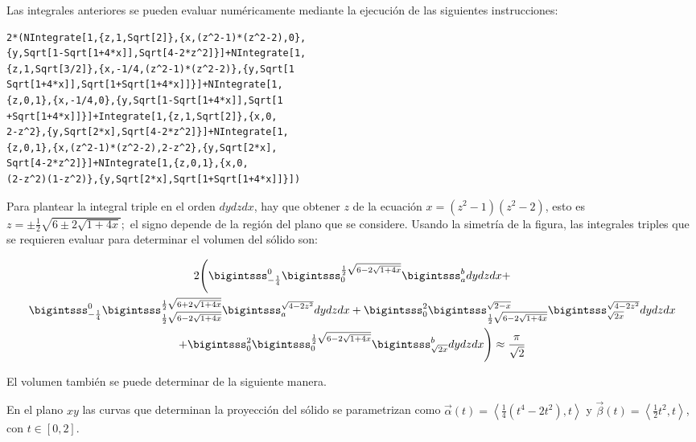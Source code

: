 Las integrales anteriores se pueden evaluar numéricamente mediante la ejecución de las siguientes instrucciones:

\begin{tcolorbox}[title=\bf Instrucción en \verb"Mathematica"]\begin{Verbatim}[formatcom=\letraverbatim]
2*(NIntegrate[1,{z,1,Sqrt[2]},{x,(z^2-1)*(z^2-2),0},
{y,Sqrt[1-Sqrt[1+4*x]],Sqrt[4-2*z^2]}]+NIntegrate[1,
{z,1,Sqrt[3/2]},{x,-1/4,(z^2-1)*(z^2-2)},{y,Sqrt[1
Sqrt[1+4*x]],Sqrt[1+Sqrt[1+4*x]]}]+NIntegrate[1,
{z,0,1},{x,-1/4,0},{y,Sqrt[1-Sqrt[1+4*x]],Sqrt[1
+Sqrt[1+4*x]]}]+Integrate[1,{z,1,Sqrt[2]},{x,0,
2-z^2},{y,Sqrt[2*x],Sqrt[4-2*z^2]}]+NIntegrate[1,
{z,0,1},{x,(z^2-1)*(z^2-2),2-z^2},{y,Sqrt[2*x],
Sqrt[4-2*z^2]}]+NIntegrate[1,{z,0,1},{x,0,
(2-z^2)(1-z^2)},{y,Sqrt[2*x],Sqrt[1+Sqrt[1+4*x]]}])
\end{Verbatim}
\end{tcolorbox}

Para plantear la integral triple en el orden $dydzdx$, hay que obtener $z$ de la ecuación $x = (z^2-1)(z^2-2)$, esto es
$z = \pm \frac{1}{2} \sqrt{6 \pm 2 \sqrt{1+4x}};$
el signo depende de la región del plano que se considere. Usando la simetría de la figura, las integrales triples que se requieren evaluar para determinar el volumen del sólido son:

{\footnotesize
\begin{multline} \label{trescilindros1}
2\Bigg( \bigintsss_{-\frac{1}{4}}^{0} \bigintsss_{0}^{\frac{1}{2}\sqrt{6-2\sqrt{1+4x}}}\bigintsss_{ a }^{b}dydzdx+\\
\bigintsss_{-\frac{1}{4}}^0 \bigintsss_{\frac{1}{2}\sqrt{6-2\sqrt{1+4x}}}^{\frac{1}{2}\sqrt{6+2\sqrt{1+4x}}}\bigintsss_{ a }^{\sqrt{4-2z^2}}dydzdx+ \bigintsss_0^2 \bigintsss_{\frac{1}{2}\sqrt{6-2\sqrt{1+4x}}}^{\sqrt{2-x}}\bigintsss_{\sqrt{2x}}^{\sqrt{4-2z^2}}dydzdx
\\ + \bigintsss_{0}^2\bigintsss_{0}^{\frac{1}{2}\sqrt{6-2\sqrt{1+4x}}} \bigintsss_{\sqrt{2x}}^{b}dydzdx\Bigg) \approx \frac{\pi}{\sqrt{2}}
\end{multline}
}

El volumen también se puede determinar de la siguiente manera.

En el plano $xy$ las curvas que determinan la proyección del sólido se parametrizan como
{\small $\overrightarrow{\alpha }(t)=\left\langle \frac{1}{4}\left(
t^{4}-2t^2\right) ,t\right\rangle$} y {\small $\overrightarrow{\beta }(t)=\left\langle \frac{1}{2}t^2,t\right\rangle$}, con $t\in [0,2]$.

